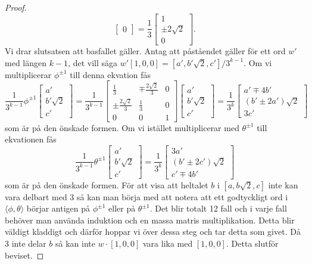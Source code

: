 \documentclass{article}
\theoremstyle{definition}
\begin{document}
\begin{proof}
\[\begin{bmatrix}
    0
  \end{bmatrix} = 
  \frac{1}{3}
  \begin{bmatrix}
    1 \\
    \pm 2 \sqrt{2} \\
    0
  \end{bmatrix}.
  \]
  Vi drar slutsatsen att basfallet gäller. Antag att påståendet gäller för ett ord $w'$ med längen $k - 1$, det vill säga 
  $w'[1, 0, 0] = [a', b' \sqrt{2}, c']/3^{k - 1}$. Om vi multiplicerar $\phi^{\pm 1}$ till denna ekvation fås 
  \[ \frac{1}{3^{k - 1}}\phi^{\pm 1} 
  \begin{bmatrix}
    a' \\
    b' \sqrt{2} \\
    c'
  \end{bmatrix} = 
  \frac{1}{3^{k - 1}}
  \begin{bmatrix}
    \frac{1}{3} & \mp \frac{2 \sqrt{2}}{3} & 0 \\
    \pm \frac{2 \sqrt{2}}{3} & \frac{1}{3} & 0 \\
    0 & 0 & 1
  \end{bmatrix}
  \begin{bmatrix}
    a' \\
    b' \sqrt{2} \\
    c'
  \end{bmatrix} = 
  \frac{1}{3^k}
  \begin{bmatrix}
    a' \mp 4b'  \\
    (b' \pm 2a')\sqrt{2} \\
    3c'
  \end{bmatrix}
  \]
  som är på den önskade formen. Om vi istället multiplicerar med $\theta^{\pm 1}$ till ekvationen fås 
  \[ \frac{1}{3^{k - 1}}\theta^{\pm 1} 
  \begin{bmatrix}
    a' \\
    b' \sqrt{2} \\
    c'
  \end{bmatrix} = 
  \frac{1}{3^k}
  \begin{bmatrix}
    3a' \\
    (b' \pm 2c')\sqrt{2} \\
    c' \mp 4b'
  \end{bmatrix}
  \]
  som är på den önskade formen.
  För att visa att heltalet $b$ i $[a, b \sqrt{2}, c]$ inte kan vara delbart med 3 så kan man börja med att notera att 
  ett godtyckligt ord i $\langle \phi, \theta \rangle$ börjar antigen på $\phi^{\pm 1}$ 
  eller på $\theta^{\pm 1}$. Det blir totalt 12 fall och i varje fall behöver man använda induktion och en massa matris multiplikation. 
  Detta blir väldigt kladdigt 
  och därför hoppar vi över dessa steg och tar detta som givet. Då 3 inte delar $b$ så kan inte $w \cdot [1, 0, 0]$ vara lika med $[1, 0, 0]$. 
  Detta slutför beviset.
\end{proof}
\end{document}
